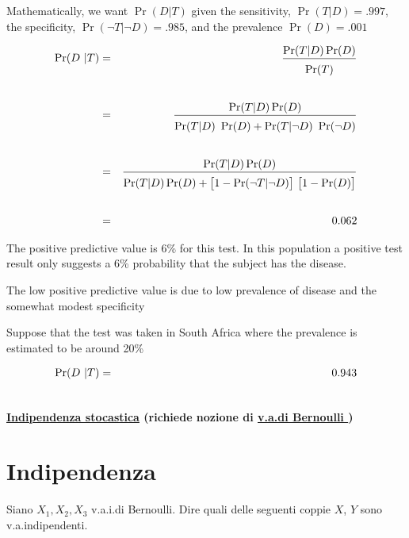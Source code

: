 \documentclass[11pt,openany]{book}
\begin{document}
Mathematically, we want $\Pr(D | T)$ given the sensitivity, {\color{violet}$\Pr(T
| D) = .997$}, the specificity, {\color{violet}$\Pr(\neg T | \neg D) =.985$}, and the
prevalence {\color{violet}$\Pr(D) = .001$}

\begin{eqnarray*}
\Pr(D ~|T)& = &\frac{\Pr(T|D)\Pr(D)}{\Pr(T)\vphantom{\Big[}}\\ \\
& = &\frac{\Pr(T|D)\Pr(D)}{\Pr(T|D)\ \Pr(D) + \Pr(T|\neg D)\ \Pr(\neg D)\vphantom{\Big[}}\\ \\
& = & \frac{\Pr(T|D)\Pr(D)}{\Pr(T|D)\Pr(D) + \big[1-\Pr(\neg T|\neg D)\big]\ \big[1 - \Pr(D)\big]\vphantom{\Big[}} \\ \\
& = & 0.062
\end{eqnarray*}

The {\color{violet}positive predictive value is 6\%} for this test. In this population a positive test result only suggests a 6\% probability that the subject has the disease. 


The low positive predictive value is due to low prevalence of disease and the
somewhat modest specificity 

Suppose that the test was taken in South Africa where the prevalence is estimated to be around 20\%

\begin{eqnarray*}
\Pr(D ~|T)& = & 0.943\\
& \hphantom{=} & \hphantom{\frac{\Pr(T|D)\Pr(D)}{\Pr(T|D)\Pr(D) + \big[1-\Pr(\neg T|\neg D)\big]\ \big[1 - \Pr(D)\big]\vphantom{\Big[}}}
\end{eqnarray*}


\clearpage\hfill
\textbf{{\color{brown}\hyperref[indipendenza]{Indipendenza stocastica} \faShare} (richiede nozione di \hyperref[Bernoulli]{v.a.\@ di Bernoulli \faShare})}
\section{Indipendenza}
\label{esercizio_indipendenza}

Siano $X_1,X_2,X_3$ v.a.i.\@ di Bernoulli. Dire quali delle seguenti coppie $X$, $Y$ sono v.a.\@ indipendenti.\medskip

\def\medrel#1{\parbox[t]{6ex}{$\displaystyle\hfil #1$}}
\def\ceq#1#2#3{\parbox[t]{16ex}{$\displaystyle #1$}\medrel{#2}$\displaystyle  #3$}
\end{document}
